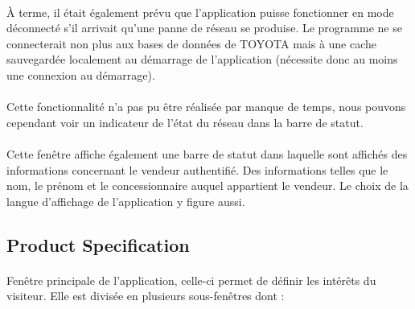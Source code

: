 \documentclass[12pt]{report}
\begin{document}
\paragraph{}
À terme, il était également prévu que l'application puisse fonctionner en mode déconnecté s'il arrivait qu'une panne de réseau se produise. Le programme ne se connecterait non plus aux bases de données de TOYOTA mais à une cache sauvegardée localement au démarrage de l'application (nécessite donc au moins une connexion au démarrage).
\paragraph{}
Cette fonctionnalité n'a pas pu être réalisée par manque de temps, nous pouvons cependant voir un indicateur de l'état du réseau dans la barre de statut.
\paragraph{}
Cette fenêtre affiche également une barre de statut dans laquelle sont affichés des informations concernant le vendeur authentifié. Des informations telles que le nom, le prénom et le concessionnaire auquel appartient le vendeur. 
Le choix de la langue d'affichage de l'application y figure aussi.

\subsection*{Product Specification}
\paragraph{}
Fenêtre principale de l'application, celle-ci permet de définir les intérêts du visiteur. Elle est divisée en plusieurs sous-fenêtres dont : 
\end{document}
